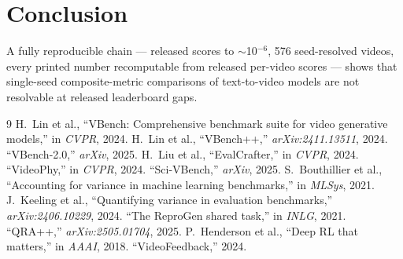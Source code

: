 \documentclass[conference]{IEEEtran}
\begin{document}
\section{Conclusion}
A fully reproducible chain --- released scores to $\sim$10$^{-6}$, 576
seed-resolved videos, every printed number recomputable from released
per-video scores --- shows that single-seed composite-metric comparisons of
text-to-video models are not resolvable at released leaderboard gaps.

\begin{thebibliography}{9}\small
{} H.~Lin et al., ``VBench: Comprehensive benchmark suite for
video generative models,'' in \emph{CVPR}, 2024.
 H.~Lin et al., ``VBench++,'' \emph{arXiv:2411.13511}, 2024.
 ``VBench-2.0,'' \emph{arXiv}, 2025.
 H.~Liu et al., ``EvalCrafter,'' in \emph{CVPR}, 2024.
 ``VideoPhy,'' in \emph{CVPR}, 2024.
 ``Sci-VBench,'' \emph{arXiv}, 2025.
 S.~Bouthillier et al., ``Accounting for
variance in machine learning benchmarks,'' in \emph{MLSys}, 2021.
 J.~Keeling et al., ``Quantifying variance in
evaluation benchmarks,'' \emph{arXiv:2406.10229}, 2024.
 ``The ReproGen shared task,'' in \emph{INLG}, 2021.
 ``QRA++,'' \emph{arXiv:2505.01704}, 2025.
 P.~Henderson et al., ``Deep RL that matters,'' in
\emph{AAAI}, 2018.
 ``VideoFeedback,'' 2024.
\end{thebibliography}
\end{document}
